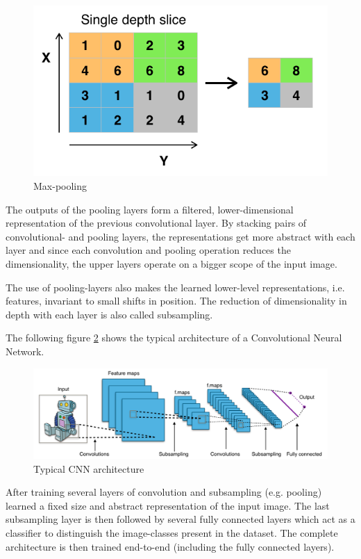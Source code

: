 \documentclass[	DIV=calc,%
				paper=a4,%
				fontsize=11pt,%
				twocolumn]{scrartcl}	 %
\begin{document}
\begin{figure}[H]
    \centering
    \includegraphics[width=.9\linewidth]{data/max_pooling.png}
    \caption{Max-pooling \cite{pooling_cnn}}
    \label{max_pooling}
\end{figure}

The outputs of the pooling layers form a filtered, lower-dimensional representation of the previous convolutional layer. By stacking pairs of convolutional- and pooling layers, the representations get more abstract with each layer and since each convolution and pooling operation reduces the dimensionality, the upper layers operate on a bigger scope of the input image.

The use of pooling-layers also makes the learned lower-level representations, i.e. features, invariant to small shifts in position. The reduction of dimensionality in depth with each layer is also called subsampling.

The following figure \ref{typical_architecture} shows the typical architecture of a Convolutional Neural Network.

\begin{figure}[H]
    \centering
    \includegraphics[width=\linewidth]{data/typical_cnn.png}
    \caption{Typical CNN architecture \cite{pooling_cnn}}
    \label{typical_architecture}
\end{figure}

After training several layers of convolution and subsampling (e.g. pooling) learned a fixed size and abstract representation of the input image. The last subsampling layer is then followed by several fully connected layers which act as a classifier to distinguish the image-classes present in the dataset. The complete architecture is then trained end-to-end (including the fully connected layers).
\end{document}

